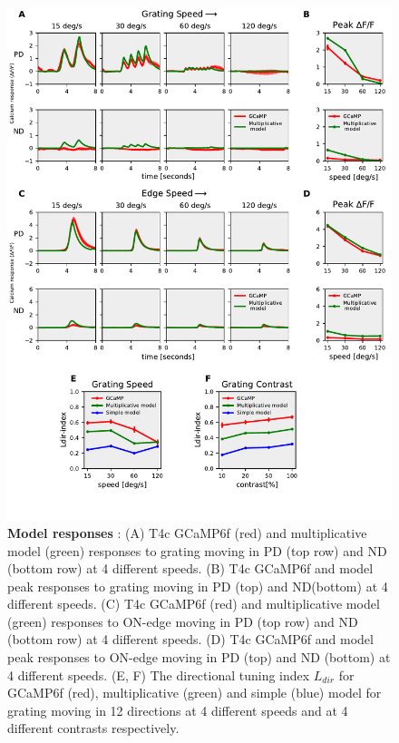 \documentclass[9pt,lineno]{elife}
\begin{document}
\begin{figure}
\begin{fullwidth}
\includegraphics[width=0.84\linewidth]{figure5}
\caption{\textbf{Model responses} : (A) T4c GCaMP6f (red) and multiplicative model (green) responses to grating moving in PD (top row) and ND (bottom row) at 4 different speeds. (B) T4c GCaMP6f and model peak responses to grating moving in PD (top) and ND(bottom) at 4 different speeds. (C) T4c GCaMP6f (red) and multiplicative model (green) responses to ON-edge moving in PD (top row) and ND (bottom row) at 4 different speeds. (D) T4c GCaMP6f and model peak responses to ON-edge moving in PD (top) and ND (bottom) at 4 different speeds. (E, F) The directional tuning index $L_{dir}$ for GCaMP6f (red), multiplicative (green) and simple (blue) model for grating moving in 12 directions at 4 different speeds and at 4 different contrasts respectively.}

\label{PDNDModel}
	
\end{fullwidth}
\end{figure} 
\end{document}
